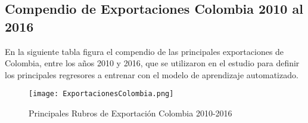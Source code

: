 \subsection{Compendio de Exportaciones Colombia 2010 al 2016}
En la siguiente tabla figura el compendio de las principales exportaciones de Colombia, entre los años 2010 y 2016, que se utilizaron en el estudio para definir los principales regresores a entrenar con el modelo de aprendizaje automatizado. \\

\begin{figure}[h!]
\centering
\texttt{[image: ExportacionesColombia.png]}
\caption{Principales Rubros de Exportación Colombia 2010-2016}
\end{figure}
